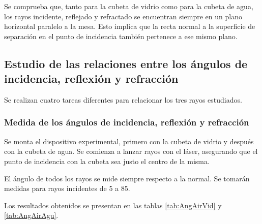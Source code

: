 \documentclass[a4paper,twocolumn]{article}
\begin{document}
            Se comprueba que, tanto para la cubeta de vidrio como para la cubeta de agua, los rayos incidente, reflejado y refractado se encuentran siempre en un plano horizontal paralelo a la mesa. Esto implica que la recta normal a la superficie de separación en el punto de incidencia también pertenece a ese mismo plano.
    
        \subsection{Estudio de las relaciones entre los ángulos de incidencia, reflexión y refracción}

            Se realizan cuatro tareas diferentes para relacionar los tres rayos estudiados.
    
        \subsubsection{Medida de los ángulos de incidencia, reflexión y refracción} \label{cap:MedAngIncReflRefr}
        
            Se monta el dispositivo experimental, primero con la cubeta de vidrio y después con la cubeta de agua. Se comienza a lanzar rayos con el láser, asegurando que el punto de incidencia con la cubeta sea justo el centro de la misma.
            
            El ángulo de todos los rayos se mide siempre respecto a la normal. Se tomarán medidas para rayos incidentes de 5 a 85\textdegree.
            
            Los resultados obtenidos se presentan en las tablas \ref{tab:AngAirVid} y \ref{tab:AngAirAgu}.
	
\end{document}
